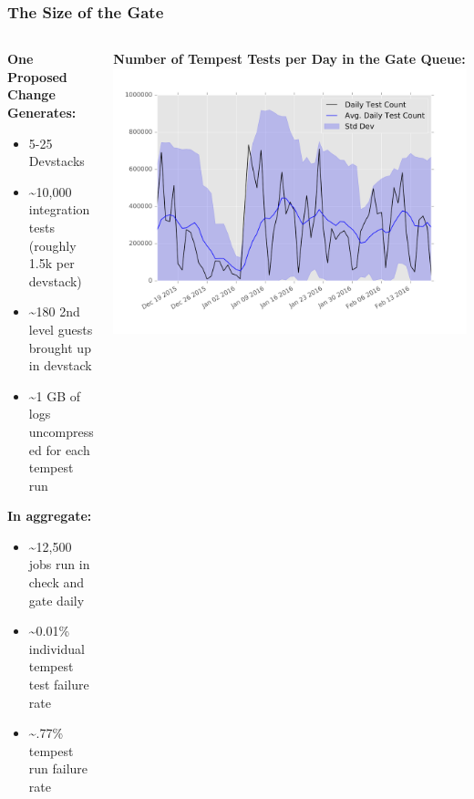 \documentclass[aspectratio=169,11pt,hyperref={colorlinks=true}]{beamer}
\begin{document}
\begin{frame}
\frametitle{The Size of the Gate}
    \begin{columns}[T]
        \begin{column}{.48\textwidth}
            \textbf{One Proposed Change Generates:}
			\begin{itemize}
				\item 5-25 Devstacks
				\item \textasciitilde10,000 integration tests (roughly 1.5k per devstack)
				\item \textasciitilde180 2nd level guests brought up in devstack
                \item \textasciitilde1 GB of logs uncompressed for each tempest run
			\end{itemize}
            \textbf{In aggregate:}
            \begin{itemize}
                \item \textasciitilde12,500 jobs run in check and gate daily
                \item \textasciitilde0.01\% individual tempest test failure rate
                \item \textasciitilde.77\% tempest run failure rate
            \end{itemize}
        \end{column}
        \begin{column}{.48\textwidth}
            \centering
            \textbf{Number of Tempest Tests per Day in the Gate Queue:}
            \includegraphics[width=1.22\textwidth]{tempest-gate-count.png}
        \end{column}
    \end{columns}
\end{frame}
\end{document}
